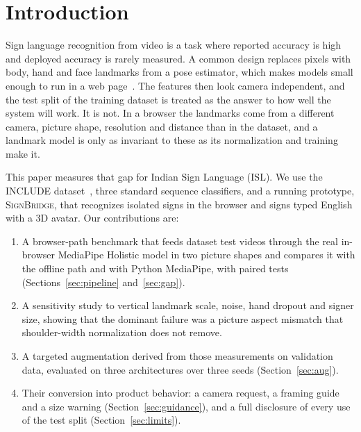 \documentclass[conference]{IEEEtran}
\newcommand{\signbridge}{\textsc{SignBridge}}
\begin{document}
\section{Introduction}
Sign language recognition from video is a task where reported accuracy is high and deployed accuracy is rarely measured. A common design replaces pixels with body, hand and face landmarks from a pose estimator, which makes models small enough to run in a web page~\cite{lugaresi2019mediapipe,bazarevsky2020blazepose,zhang2020mediapipehands}. The features then look camera independent, and the test split of the training dataset is treated as the answer to how well the system will work. It is not. In a browser the landmarks come from a different camera, picture shape, resolution and distance than in the dataset, and a landmark model is only as invariant to these as its normalization and training make it.

This paper measures that gap for Indian Sign Language (ISL). We use the INCLUDE dataset~\cite{sridhar2020include}, three standard sequence classifiers, and a running prototype, \signbridge{}, that recognizes isolated signs in the browser and signs typed English with a 3D avatar. Our contributions are:
\begin{enumerate}
\item A browser-path benchmark that feeds dataset test videos through the real in-browser MediaPipe Holistic model in two picture shapes and compares it with the offline path and with Python MediaPipe, with paired tests (Sections~\ref{sec:pipeline} and~\ref{sec:gap}).
\item A sensitivity study to vertical landmark scale, noise, hand dropout and signer size, showing that the dominant failure was a picture aspect mismatch that shoulder-width normalization does not remove.
\item A targeted augmentation derived from those measurements on validation data, evaluated on three architectures over three seeds (Section~\ref{sec:aug}).
\item Their conversion into product behavior: a camera request, a framing guide and a size warning (Section~\ref{sec:guidance}), and a full disclosure of every use of the test split (Section~\ref{sec:limits}).
\end{enumerate}
\end{document}
